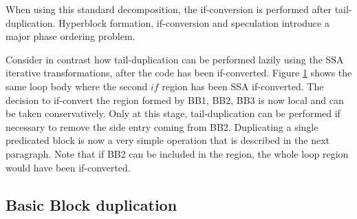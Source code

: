 \begin{figure}[h]
{    \label{fig:hyper4}}
\end{figure}

When using this standard decomposition, the if-conversion is performed after tail-duplication. Hyperblock formation, if-conversion and speculation introduce a major phase ordering problem. 

Consider in contrast how tail-duplication can be performed lazily using the SSA iterative transformations, after the code has been if-converted. Figure \ref{fig:hyper4} shows the same loop body where the second $if$ region has been SSA if-converted. The decision to if-convert the region formed by {BB1, BB2, BB3} is now local and can be taken conservatively. Only at this stage, tail-duplication can be performed if necessary to remove the side entry coming from BB2. Duplicating a single predicated block is now a very simple operation that is described in the next paragraph. Note that if BB2 can be included in the region, the whole loop region would have been if-converted.

\subsection{Basic Block duplication}

